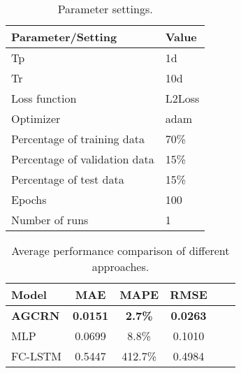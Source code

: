 \documentclass{article}
\begin{document}
\begin{table}
    \centering
    \caption{Parameter settings.}
    \begin{tabularx}{0.6\textwidth}{@{}lX@{}}
        \hline
        Parameter/Setting             & Value  \\
        \hline
        Tp                            & 1d     \\
        Tr                            & 10d    \\
        Loss function                 & L2Loss \\
        Optimizer                     & adam   \\
        Percentage of training data   & 70\%   \\
        Percentage of validation data & 15\%   \\
        Percentage of test data       & 15\%   \\
        Epochs                        & 100    \\
        Number of runs                & 1      \\
        \hline
    \end{tabularx}
\end{table}




\begin{table}[h]
    \centering
    \caption{Average performance comparison of different approaches.}
    \begin{tabular}{l c c c c c}
        \hline
        Model          & MAE             & MAPE           & RMSE            \\
        \hline
        \textbf{AGCRN} & \textbf{0.0151} & \textbf{2.7\%} & \textbf{0.0263} \\
        MLP            & 0.0699          & 8.8\%          & 0.1010          \\
        FC-LSTM        & 0.5447          & 412.7\%        & 0.4984          \\
        \hline
    \end{tabular}
\end{table}
\end{document}
